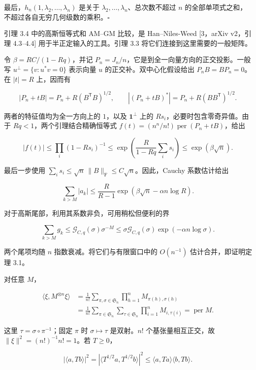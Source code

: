 \documentclass[11pt,a4paper]{article}
\begin{document}
最后，\(h_n(1,\lambda_2,\ldots,\lambda_n)\) 是关于 \(\lambda_2,\ldots,\lambda_n\)、总次数不超过 \(n\) 的全部单项式之和，不超过各自无穷几何级数的乘积。\(\square\)

引理 3.4 中的高斯恒等式和 AM--GM 比较，是 Han--Niles-Weed {[}3，arXiv v2，引理 4.3--4.4{]} 用于半正定输入的工具。引理 3.3 将它们连接到这里需要的一般矩阵。

令 \(\beta=RC/(1-Rq)\)，并记 \(P_n=J_n/n\)，它是到全一向量方向的正交投影。一般写 \(u^\perp=\{v:u^*v=0\}\) 表示向量 \(u\) 的正交补。双中心化假设给出 \(P_nB=BP_n=0\)。在 \(|t|=R\) 上，因而有

\[
|P_n+tB|=P_n+R(B^{\mathsf T}B)^{1/2},
\qquad
|(P_n+tB)^*|=P_n+R(BB^{\mathsf T})^{1/2}.
\]

两者的特征值均为全一方向上的 \(1\)，以及 \(\mathbf1^\perp\) 上的 \(Rs_i\)，必要时包含零奇异值。由于 \(Rq<1\)，两个引理结合精确恒等式 \(f(t)=(n^n/n!)\operatorname{per}(P_n+tB)\)，给出

\[
|f(t)|\le\prod_i(1-Rs_i)^{-1}
\le\exp\!\left(\frac{R}{1-Rq}\sum_i s_i\right)
\le\exp(\beta\sqrt n).
\]

最后一步使用 \(\sum_i s_i\le\sqrt n\,\|B\|_{\mathrm F}\le C\sqrt n\)。因此，Cauchy 系数估计给出

\[
\sum_{k>M}|a_k|
\le\frac{R}{R-1}
\exp\!\left(\beta\sqrt n-\alpha n\log R\right).
\]

对于高斯尾部，利用其系数非负，可用稍松但便利的界

\[
\sum_{k>M}g_k
\le \mathcal G_{C,q}(\sigma)\sigma^{-M}
\le\sigma\mathcal G_{C,q}(\sigma)\exp\!\left(-\alpha n\log\sigma\right).
\]

两个尾项均随 \(n\) 指数衰减。将它们与有限窗口中的 \(O(n^{-1})\) 估计合并，即证明定理 3.1。

对任意 \(M\)，

\[
\begin{aligned}
\langle\xi,M^{\otimes n}\xi\rangle
&=\frac1{n!}\sum_{\pi,\sigma\in \mathfrak S_n}\prod_{h=1}^nM_{\pi(h),\sigma(h)}\\
&=\frac1{n!}\sum_{\pi\in \mathfrak S_n}\sum_{\tau\in \mathfrak S_n}\prod_{i=1}^nM_{i,\tau(i)}
=\operatorname{per}M.
\end{aligned}
\]

这里 \(\tau=\sigma\circ\pi^{-1}\)；固定 \(\pi\) 时 \(\sigma\mapsto\tau\) 是双射。\(n!\) 个基张量相互正交，故 \(\|\xi\|^2=(n!)^{-1}n!=1\)。若 \(T\ge0\)，

\[
|\langle a,Tb\rangle|^2
=|\langle T^{1/2}a,T^{1/2}b\rangle|^2
\le\langle a,Ta\rangle\langle b,Tb\rangle.
\]
\end{document}
